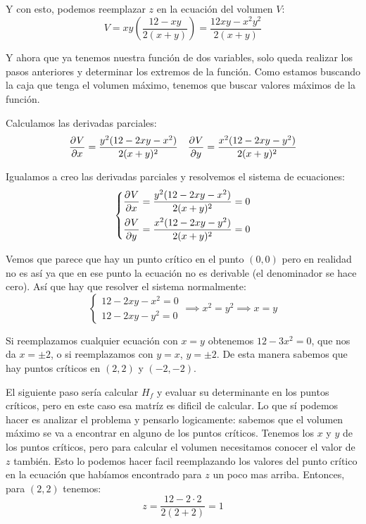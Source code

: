 \documentclass[12pt]{article}
\begin{document}
Y con esto, podemos reemplazar $ z $ en la ecuación del volumen $ V $:
\[
	V = xy\left(\frac{12-xy}{2(x+y)}\right) = \frac{12xy-x^2y^2}{2(x+y)}
\]

Y ahora que ya tenemos nuestra función de dos variables, solo queda realizar los pasos anteriores y determinar los extremos de la función. Como estamos buscando la caja que tenga el volumen máximo, tenemos que buscar valores máximos de la función.

Calculamos las derivadas parciales:
\begin{align*}
  \pdv[]{V}{x} = \frac{y^2(12-2xy-x^2)}{2(x+y)^2} && \pdv[]{V}{y} = \frac{x^2(12-2xy-y^2)}{2(x+y)^2}
\end{align*}

Igualamos a creo las derivadas parciales y resolvemos el sistema de ecuaciones:
\[
\left\{
\begin{aligned}
  \pdv[]{V}{x} = \frac{y^2(12-2xy-x^2)}{2(x+y)^2} = 0 \\
  \pdv[]{V}{y} = \frac{x^2(12-2xy-y^2)}{2(x+y)^2} = 0
\end{aligned}
\right.
\]  

Vemos que parece que hay un punto crítico en el punto $ (0,0) $ pero en realidad no es así ya que en ese punto la ecuación no es derivable (el denominador se hace cero). Así que hay que resolver el sistema normalmente:
\[
  \left\{
  \begin{aligned}
    12-2xy-x^2 = 0 \\
    12-2xy-y^2 = 0
  \end{aligned}
  \right.  \implies x^2 = y^2  \implies x = y
\]

Si reemplazamos cualquier ecuación con $ x = y $ obtenemos $ 12 - 3x^2 = 0 $, que nos da $ x = \pm 2 $, o si reemplazamos con $ y=x $, $ y=\pm 2 $. De esta manera sabemos que hay puntos críticos en $ (2,2) $ y $ (-2,-2) $.

El siguiente paso sería calcular $ H_{f} $ y evaluar su determinante en los puntos críticos, pero en este caso esa matríz es dificil de calcular. Lo que sí podemos hacer es analizar el problema y pensarlo logicamente: sabemos que el volumen máximo se va a encontrar en alguno de los puntos críticos. Tenemos los $ x $ y $ y $ de los puntos críticos, pero para calcular el volumen necesitamos conocer el valor de $ z $ también. Esto lo podemos hacer facil reemplazando los valores del punto crítico en la ecuación que habíamos encontrado para $ z $ un poco mas arriba. Entonces, para $ (2,2) $ tenemos:
\[
  z = \frac{12-2 \cdot  2}{2(2+2)} = 1
\]
\end{document}
